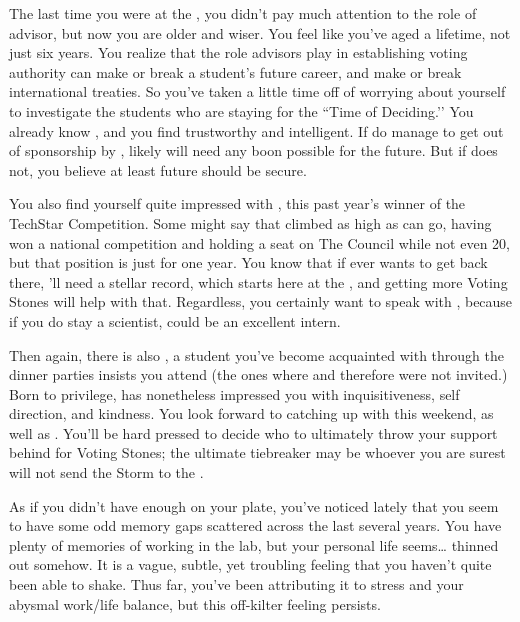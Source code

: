 \documentclass[char]{GL2020}
\begin{document}
The last time you were at the \pSchool{}, you didn't pay much attention to the role of advisor, but now you are older and wiser. You feel like you’ve aged a lifetime, not just six years. You realize that the role advisors play in establishing voting authority can make or break a student's future career, and make or break international treaties. So you've taken a little time off of worrying about yourself to investigate the \pTech{} students who are staying for the ``Time of Deciding.’’ You already know \cScholarship{}, and you find \cScholarship{\them} trustworthy and intelligent. If \cScholarship{\they} do manage to get out of sponsorship by \cAntiChup{}, \cScholarship{} likely will need any boon possible for the future. But if \cScholarship{} does not, you believe at least \cScholarship{\their} future should be secure.

You also find yourself quite impressed with \cTechStar{\full}, this past year's winner of the TechStar Competition. Some might say that \cTechStar{\they} \cTechStar{\have} climbed as high as \cTechStar{\they} can go, having won a national competition and holding a seat on The Council while not even 20, but that position is just for one year. You know that if \cTechStar{\they} ever wants to get back there, \cTechStar{\they}'ll need a stellar record, which starts here at the \pSc{}, and getting more Voting Stones will help with that. Regardless, you certainly want to speak with \cTechStar{}, because if you do stay a scientist, \cTechStar{\they} could be an excellent intern.  

Then again, there is also \cHeir{\full}, a student you've become acquainted with through the dinner parties \cHeir{\their} \cDiplomat{\auncle} \cDiplomat{} insists you attend (the ones where \cAntiChup{} and therefore \cScholarship{} were not invited.) Born to privilege, \cHeir{} has nonetheless impressed you with \cHeir{\their} inquisitiveness, self direction, and kindness. You look forward to catching up with \cHeir{\them} this weekend, as well as \cScholarship{}. You'll be hard pressed to decide who to ultimately throw your support behind for Voting Stones; the ultimate tiebreaker may be whoever you are surest will not send the Storm to the \pTech{}.

As if you didn't have enough on your plate, you've noticed lately that you seem to have some odd memory gaps scattered across the last several years. You have plenty of memories of working in the lab, but your personal life seems\ldots{} thinned out somehow. It is a vague, subtle, yet troubling feeling that you haven't quite been able to shake. Thus far, you've been attributing it to stress and your abysmal work/life balance, but this off-kilter feeling persists.
\end{document}
